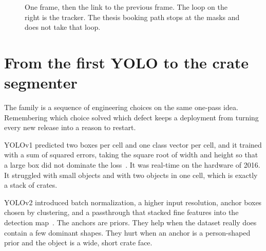 \documentclass[11pt,a4paper]{article}
\begin{document}
\begin{figure}[t]
\centering
{}
\caption{One frame, then the link to the previous frame. The loop on the right is the tracker. The thesis booking path stops at the masks and does not take that loop.}
\label{fig:pipe}
\end{figure}

\section{From the first YOLO to the crate segmenter}
\label{sec:line}

The family is a sequence of engineering choices on the same one-pass idea. Remembering which choice solved which defect keeps a deployment from turning every new release into a reason to restart.

YOLOv1 predicted two boxes per cell and one class vector per cell, and it trained with a sum of squared errors, taking the square root of width and height so that a large box did not dominate the loss~\cite{redmon2016yolo}. It was real-time on the hardware of 2016. It struggled with small objects and with two objects in one cell, which is exactly a stack of crates.

YOLOv2 introduced batch normalization, a higher input resolution, anchor boxes chosen by clustering, and a passthrough that stacked fine features into the detection map~\cite{redmon2017yolo9000}. The anchors are priors. They help when the dataset really does contain a few dominant shapes. They hurt when an anchor is a person-shaped prior and the object is a wide, short crate face.
\end{document}
